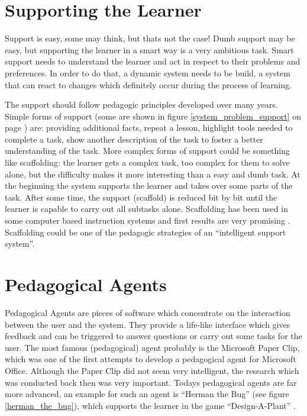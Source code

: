 \section{Supporting the Learner}
\label{Supporting the learner}
Support is easy, some may think, but thats not the case! Dumb support may be
easy, but supporting the learner in a smart way is a very ambitious task.
Smart support needs to understand the learner and act in respect to their
problems and preferences. In order to do that, a dynamic system needs to be
build, a system that can react to changes which definitely occur during the
process of learning.

The support should follow pedagogic principles developed over many years.
Simple forms of support (some are shown in figure \ref{system_problem_support} on
page \pageref{system_problem_support}) are: providing additional facts, repeat a lesson,
highlight tools needed to complete a task, show another description of the
task to foster a better understanding of the task. More complex forms of
support could be something like scaffolding: the learner gets a complex task,
too complex for them to solve alone, but the difficulty makes it more
interesting than a easy and dumb task. At the beginning the system supports
the learner and takes over some parts of the task. After some time, the support
(scaffold) is reduced bit by bit until the learner is capable to carry out all
subtasks alone. Scaffolding has been used in some computer based instruction
systems and first results are very promising \cite{Azevedo2005c,
ElSaadawi2010, Lai2009a}. Scaffolding could be one
of the pedagogic strategies of an ``intelligent support system''.

\section{Pedagogical Agents}
\label{pedagogical_agents}
Pedagogical Agents are pieces of software which concentrate on the interaction
between the user and the system. They provide a life-like interface which
gives feedback and can be triggered to answer questions or carry out some
tasks for the user. The most famous (pedagogical) agent probably is the
Microsoft Paper Clip, which was one of the first attempts to develop a
pedagogical agent for Microsoft Office. Although the Paper Clip did not seem very intelligent, the
research which was conducted back then was very important. Todays pedagogical
agents are far more advanced, an example for such an agent is ``Herman the
Bug'' (see figure \ref{herman_the_bug}), which supports the learner in
the game ``Design-A-Plant'' \cite{Lester1997c}.

